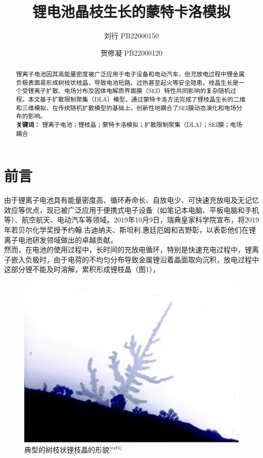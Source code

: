 \documentclass{article}
\title{\bfseries 锂电池晶枝生长的蒙特卡洛模拟}
\author{
 刘行 \quad PB22000150\\
    \and
 贺修凝 \quad PB22000120     
}
\begin{document}
\maketitle
\begin{abstract}
锂离子电池因其高能量密度被广泛应用于电子设备和电动汽车，但充放电过程中锂金属负极表面易形成树枝状枝晶，导致电池短路、过热甚至起火等安全隐患。枝晶生长是一个受锂离子扩散、电场分布及固体电解质界面膜（SEI）特性共同影响的复杂随机过程。本文基于扩散限制聚集（DLA）模型，通过蒙特卡洛方法完成了锂枝晶生长的二维和三维模拟，在传统随机扩散模型的基础上，创新性地耦合了SEI膜动态演化和电场分布的影响。\\

\textbf{关键词：} 锂离子电池；锂枝晶；蒙特卡洛模拟；扩散限制聚集（DLA）；SEI膜；电场耦合 
\end{abstract}


\section{前言}
由于锂离子电池具有能量密度高、循环寿命长、自放电少、可快速充放电及无记忆效应等优点，现已被广泛应用于便携式电子设备（如笔记本电脑、平板电脑和手机等）、航空航天、电动汽车等领域。2019年10月9日，瑞典皇家科学院宣布，将2019年若贝尔化学奖授予约翰.古迪纳夫、斯坦利.惠廷厄姆和吉野彰，以表彰他们在锂离子电池研发领域做出的卓越贡献。\\

然而，在电池的使用过程中，长时间的充放电循环，特别是快速充电过程中，锂离子嵌入负极时，由于电荷的不均匀分布导致金属锂沿着晶面取向沉积，放电过程中这部分锂不能及时溶解，累积形成锂枝晶（图1），
\begin{figure}[H]
 \centering
 \includegraphics[scale=0.45]{figs/2.jpg}
\caption{典型的树枝状锂枝晶的形貌$^{\textup{\cite{ref1}}}$}
\end{figure}
\end{document}
